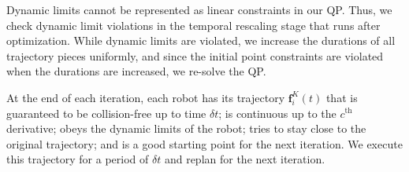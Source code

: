 \documentclass{svproc}
\newcommand{\vf}{\mathbf{f}}
\renewcommand{\th}{^{\text{th}}}
\begin{document}
Dynamic limits cannot be represented as linear constraints in our QP.
Thus, we check dynamic limit violations in the temporal rescaling stage that runs after optimization.
While dynamic limits are violated, we increase the durations of all trajectory pieces uniformly, and since the initial point constraints are violated when the durations are increased, we re-solve the QP.

At the end of each iteration, each robot has its trajectory $\vf^{K}_i(t)$ that is guaranteed to be collision-free up to time $\delta t$; is continuous up to the $c\th$ derivative; obeys the dynamic limits of the robot; tries to stay close to the original trajectory; and is a good starting point for the next iteration. We execute this trajectory for a period of $\delta t$ and replan for the next iteration.
\end{document}
